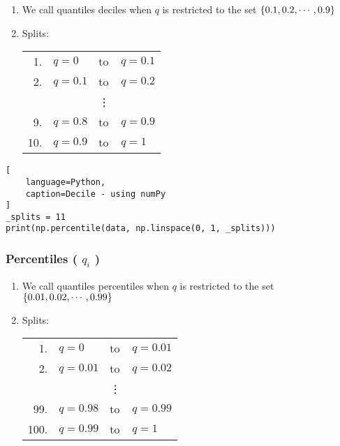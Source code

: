 \begin{enumerate}
    \item We call quantiles deciles when $q$ is restricted to the set $\left\{0.1, 0.2,\cdots, 0.9\right\}$ \hfill \cite{statistics/book/Statistics-for-Data-Scientists/Maurits-Kaptein}

    \item Splits: \\
    \begin{tabular}{r l l l} %
        1. & $q = 0$ & to & $q = 0.1$ \\
        2. & $q = 0.1$ & to & $q = 0.2$ \\
        && \vdots & \\
        9. & $q = 0.8$ & to & $q = 0.9$ \\
        10. & $q = 0.9$ & to & $q = 1$ \\
    \end{tabular}
\end{enumerate}


\begin{lstlisting}[
    language=Python, 
    caption=Decile - using numPy
]
_splits = 11
print(np.percentile(data, np.linspace(0, 1, _splits)))
\end{lstlisting}


\subsubsection{Percentiles ( $q_i$ ) \cite{statistics/book/Statistics-for-Data-Scientists/Maurits-Kaptein}} \label{Data/Describing Data/Central Tendency/Percentiles}

\begin{enumerate}
    \item We call quantiles percentiles when $q$ is restricted to the set $\left\{0.01, 0.02,\cdots, 0.99\right\}$ \hfill \cite{statistics/book/Statistics-for-Data-Scientists/Maurits-Kaptein}

    \item Splits: \\
    \begin{tabular}{r l l l} %
        1. & $q = 0$ & to & $q = 0.01$ \\
        2. & $q = 0.01$ & to & $q = 0.02$ \\
        & & \vdots & \\
        99. & $q = 0.98$ & to & $q = 0.99$ \\
        100. & $q = 0.99$ & to & $q = 1$ \\
    \end{tabular}
\end{enumerate}


